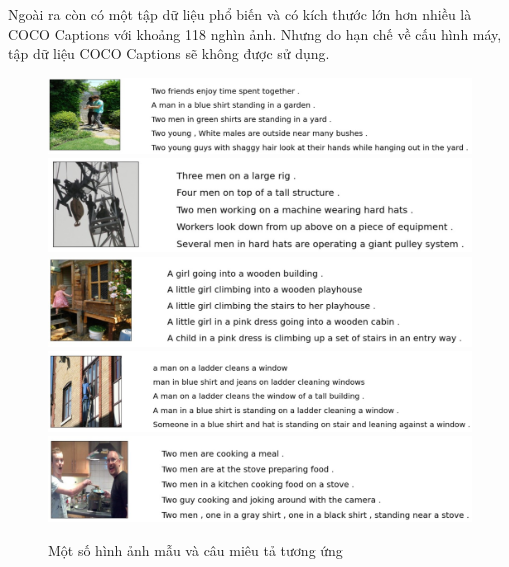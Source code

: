 \documentclass[14pt, a4paper]{article}
\numberwithin{equation}{section}
\numberwithin{algorithm}{section}
\numberwithin{figure}{section}
\numberwithin{dl}{section}
\numberwithin{md}{section}
\numberwithin{bd}{section}
\numberwithin{dn}{section}
\numberwithin{hq}{section}
\begin{document}
    Ngoài ra còn có một tập dữ liệu phổ biến và có kích thước lớn hơn nhiều là COCO Captions với khoảng 118 nghìn ảnh.
    Nhưng do hạn chế về cấu hình máy, tập dữ liệu COCO Captions sẽ không được sử dụng.

    \begin{figure}[h!] \centering

        \includegraphics[scale=0.6]{Flickr_Sample_1.jpg}
        \includegraphics[scale=0.6]{Flickr_Sample_2.jpg}
        \includegraphics[scale=0.6]{Flickr_Sample_3.jpg}
        \includegraphics[scale=0.6]{Flickr_Sample_4.jpg}
        \includegraphics[scale=0.6]{Flickr_Sample_5.jpg}
        \caption{Một số hình ảnh mẫu và câu miêu tả tương ứng}
        \label{fig:Flickr30k-Sample-Image}

    \end{figure}
\end{document}
